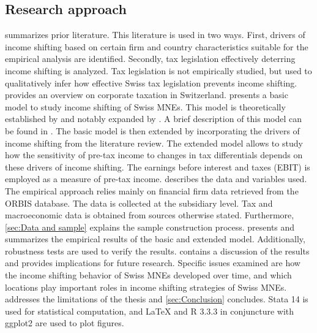 \documentclass[10pt,twocolumn,oneside,cmyk]{article}
\begin{document}
\subsection{Research approach} \label{Research approach}
 summarizes prior literature. This literature is used in two ways. First, drivers of income shifting based on certain firm and country characteristics suitable for the empirical analysis are identified. Secondly, tax legislation effectively deterring income shifting is analyzed. Tax legislation is not empirically studied, but used to qualitatively infer how effective Swiss tax legislation prevents income shifting.  provides an overview on corporate taxation in Switzerland.  presents a basic model to study income shifting of Swiss MNEs. This model is theoretically established by \textcite{hines_fiscal_1994} and notably expanded by \textcite{huizinga_international_2008}. A brief description of this model can be found in \textcite[424-427]{dharmapala_what_2014}. The basic model is then extended by incorporating the drivers of income shifting from the literature review. The extended model allows to study how the sensitivity of pre-tax income to changes in tax differentials depends on these drivers of income shifting. The earnings before interest and taxes (EBIT) is employed as a measure of pre-tax income.  describes the data and variables used. The empirical approach relies mainly on financial firm data retrieved from the ORBIS database. The data is collected at the subsidiary level. Tax and macroeconomic data is obtained from sources otherwise stated. Furthermore, \cref{sec:Data and sample} explains the sample construction process.  presents and summarizes the empirical results of the basic and extended model. Additionally, robustness tests are used to verify the results.  contains a discussion of the results and provides implications for future research. Specific issues examined are how the income shifting behavior of Swiss MNEs developed over time, and which locations play important roles in income shifting strategies of Swiss MNEs.  addresses the limitations of the thesis and \cref{sec:Conclusion} concludes. Stata 14 \parencite{statacorp._stata_2015} is used for statistical computation, and \LaTeX \parencite{the_tex_users_group_mactex-2017_2017} and R 3.3.3 in conjuncture with ggplot2 \parencites{rcoreteam_2017}{wickham_ggplot2_2016} are used to plot figures.
\end{document}
